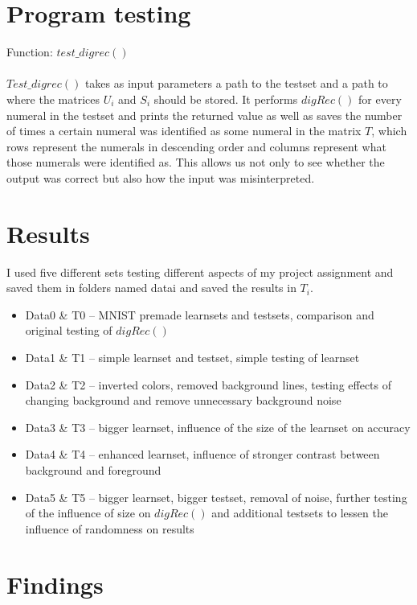 \documentclass{article}
\begin{document}
	\section{Program testing}
	Function: $test\_digrec()$
	
	\paragraph{}
	$Test\_digrec()$ takes as input parameters a path to the testset and a path to where the matrices $U_i$ and $S_i$ should be stored.
	It performs $digRec()$ for every numeral in the testset and prints the returned value as well as saves the number of times a certain numeral was identified as some numeral in the matrix $T$, which rows represent the numerals in descending order and columns represent what those numerals were identified as.
	This allows us not only to see whether the output was correct but also how the input was misinterpreted.
	
	\section{Results}
	I used five different sets testing different aspects of my project assignment and saved them in folders named datai and saved the results in $T_i$.
	\begin{itemize}
	\item Data0 \& T0 – MNIST premade learnsets and testsets, comparison and original testing   of $digRec()$
	\item Data1 \& T1 – simple learnset and testset, simple testing of learnset
	\item Data2 \& T2 – inverted colors, removed background lines, testing effects of changing background and remove unnecessary background noise 
	\item Data3 \& T3 – bigger learnset, influence of the size of the learnset on accuracy
	\item Data4 \& T4 – enhanced learnset, influence of stronger contrast between background and foreground
	\item Data5 \& T5 – bigger learnset, bigger testset, removal of noise, further testing of the influence of size on $digRec()$ and additional testsets to lessen the influence of randomness on results
	\end{itemize}
	
	\section{Findings}
	
\end{document}
